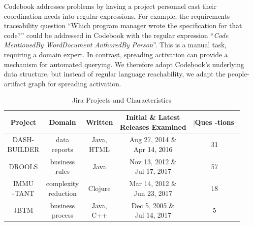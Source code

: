 \documentclass[conference]{IEEEtran}
\begin{document}
Codebook addresses problems by having a project personnel cast their coordination needs into regular expressions. For example, the requirements traceability question ``Which program manager wrote the specification for that code?'' could be addressed in Codebook with the regular expression ``\textit{Code MentionedBy WordDocument AuthoredBy Person}''. This is a manual task, requiring a domain expert. In contrast, spreading activation can provide a mechanism for automated querying. We therefore adopt Codebook's underlying data structure, but instead of regular language reachability, we adapt the people-artifact graph for spreading activation.


\begin{table}[!b]
  \caption{Jira Projects and Characteristics}
  \centering
  \begin{tabular}{ |c|| c | c | c | c |  }
    \hline
    Project & Domain & Written & \makecell{Initial \& Latest\\Releases Examined} & \makecell{$|$Ques\\-tions$|$} \\
    \hline
    \makecell{DASH-\\BUILDER} & \makecell{data\\reports} & \makecell{Java,\\HTML} & \makecell{Aug 27, 2014 \& \\Apr 14, 2016} & 31 \\
    \hline
    DROOLS & \makecell{business\\rules} & Java & \makecell{Nov 13, 2012 \&\\Jul 17, 2017} & 57 \\
    \hline
    \makecell{IMMU\\-TANT} & \makecell{complexity\\reduction} & Clojure & \makecell{Mar 14, 2012 \&\\Jun 23, 2017} & 18 \\
    \hline
    JBTM & \makecell{business\\process} & \makecell{Java,\\C++} & \makecell{Dec 5, 2005 \&\\Jul 14, 2017} & 5 \\
    \hline
  \end{tabular}
  \label{tab:jiraProjects}
\end{table}

\end{document}
